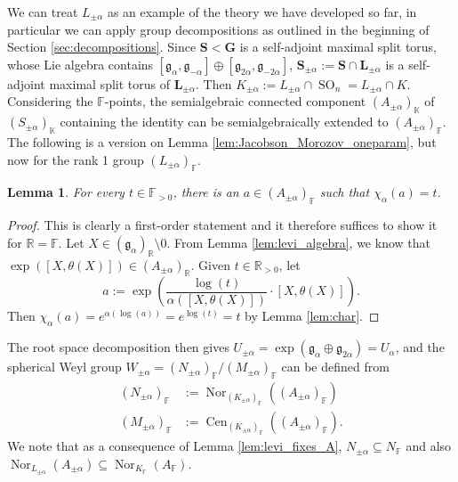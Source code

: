 \documentclass[12pt]{amsart}
\newcommand{\F}{\mathbb{F} }
\newcommand{\R}{\mathbb{R} }
\newcommand{\K}{\mathbb{K}}
\newcommand{\frakg}{\mathfrak{g}}
\newcommand{\bG}{\mathbf{G}}
\newcommand{\bS}{\mathbf{S}}
\newcommand{\bL}{\mathbf{L}}
\numberwithin{equation}{section}
\newtheorem{lemma}[theorem]{Lemma}
\theoremstyle{remark} %
\begin{document}
We can treat $L_{\pm \alpha}$ as an example of the theory we have developed so far, in particular we can apply group decompositions as outlined in the beginning of Section \ref{sec:decompositions}. Since $\bS <\bG$ is a self-adjoint maximal split torus, whose Lie algebra contains $[\frakg_\alpha, \frakg_{-\alpha}] \oplus [\frakg_{2\alpha}, \frakg_{-2\alpha}]$, $\bS_{\pm \alpha}:= \bS \cap \bL_{\pm \alpha}$ is a self-adjoint maximal split torus of $\bL_{\pm \alpha}$. Then $K_{\pm \alpha} := L_{\pm \alpha} \cap \operatorname{SO}_n = L_{\pm \alpha} \cap K$. Considering the $\F$-points, the semialgebraic connected component $(A_{\pm \alpha})_\K$ of $(S_{\pm \alpha})_\K$ containing the identity can be semialgebraically extended to $(A_{\pm \alpha})_\F$. The following is a version on Lemma \ref{lem:Jacobson_Morozov_oneparam}, but now for the rank 1 group $(L_{\pm \alpha})_\F$.
\begin{lemma}
	For every $t \in \F_{>0}$, there is an $a \in (A_{\pm \alpha})_\F$ such that $\chi_\alpha(a) = t$.
\end{lemma}
\begin{proof}
	This is clearly a first-order statement and it therefore suffices to show it for $\R = \F$. Let $X \in (\frakg_\alpha)_\R \setminus 0$. From Lemma \ref{lem:levi_algebra}, we know that $\exp([X, \theta(X)]) \in (A_{\pm \alpha})_\R$. Given $t \in \R_{>0}$, let
	$$
	a := \exp \left( \frac{ \log(t) }{\alpha([X,\theta(X)])}  \cdot [X,\theta(X)] \right).
	$$
	Then 
	$
	\chi_\alpha(a) = e^{\alpha(\log(a))} = e^{\log(t)} = t
	$
	by Lemma \ref{lem:char}.
\end{proof}
The root space decomposition then gives $U_{\pm \alpha}=\exp(\frakg_\alpha \oplus \frakg_{2\alpha}) = U_\alpha$, and the spherical Weyl group $W_{\pm \alpha} = (N_{\pm \alpha})_\F / (M_{\pm \alpha})_\F$ can be defined from \begin{align*}
	(N_{\pm\alpha})_\F &:= \operatorname{Nor}_{(K_{\pm \alpha})_\F}((A_{\pm \alpha})_\F)\\
	(M_{\pm\alpha})_\F &:= \operatorname{Cen}_{(K_{\pm \alpha})_\F}((A_{\pm \alpha})_\F).
\end{align*}
We note that as a consequence of Lemma \ref{lem:levi_fixes_A}, $N_{\pm \alpha} \subseteq N_\F$ and also $\operatorname{Nor}_{L_{\pm \alpha}}(A_{\pm \alpha}) \subseteq \operatorname{Nor}_{K_\F}(A_\F)$. 
\end{document}
